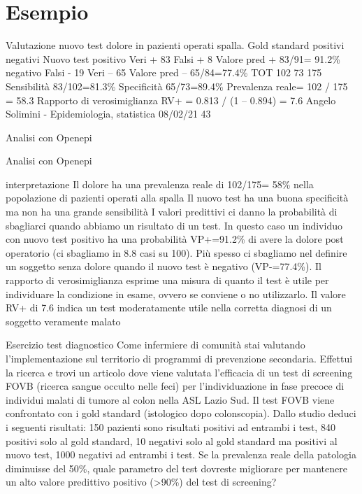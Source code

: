 \documentclass[]{book}
\begin{document}
\hypertarget{esempio-1}{%
\section{Esempio}\label{esempio-1}}

Valutazione nuovo test dolore in pazienti operati spalla.
Gold standard
positivi
negativi
Nuovo test
positivo
Veri +
83
Falsi +
8
Valore pred + 83/91= 91.2\%
negativo
Falsi -
19
Veri --
65
Valore pred -- 65/84=77.4\%
TOT
102
73
175
Sensibilità 83/102=81.3\%
Specificità 65/73=89.4\%
Prevalenza reale= 102 / 175 = 58.3
Rapporto di verosimiglianza RV+ = 0.813 / (1 -- 0.894) = 7.6
Angelo Solimini - Epidemiologia, statistica
08/02/21
43

Analisi con Openepi

Analisi con Openepi

interpretazione
Il dolore ha una prevalenza reale di 102/175= 58\% nella popolazione di pazienti operati alla spalla
Il nuovo test ha una buona specificità ma non ha una grande sensibilità
I valori predittivi ci danno la probabilità di sbagliarci quando abbiamo un risultato di un test.
In questo caso un individuo con nuovo test positivo ha una probabilità VP+=91.2\% di avere la dolore post operatorio (ci sbagliamo in 8.8 casi su 100).
Più spesso ci sbagliamo nel definire un soggetto senza dolore quando il nuovo test è negativo (VP-=77.4\%).
Il rapporto di verosimiglianza esprime una misura di quanto il test è utile per individuare la condizione in esame, ovvero se conviene o no utilizzarlo.
Il valore RV+ di 7.6 indica un test moderatamente utile nella corretta diagnosi di un soggetto veramente malato

Esercizio test diagnostico
Come infermiere di comunità stai valutando l'implementazione sul territorio di programmi di prevenzione secondaria. Effettui la ricerca e trovi un articolo dove viene valutata l'efficacia di un test di screening FOVB (ricerca sangue occulto nelle feci) per l'individuazione in fase precoce di individui malati di tumore al colon nella ASL Lazio Sud. Il test FOVB viene confrontato con i gold standard (istologico dopo colonscopia).
Dallo studio deduci i seguenti risultati:
150 pazienti sono risultati positivi ad entrambi i test,
840 positivi solo al gold standard,
10 negativi solo al gold standard ma positivi al nuovo test, 1000 negativi ad entrambi i test.
Se la prevalenza reale della patologia diminuisse del 50\%, quale parametro del test dovreste migliorare per mantenere un alto valore predittivo positivo (\textgreater{}90\%) del test di screening?
\end{document}
